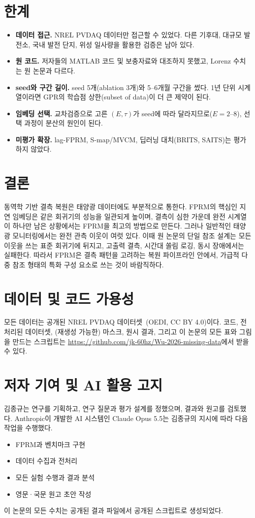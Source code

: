 \documentclass[11pt,a4paper]{article}
\begin{document}
\section{한계}\label{sec:limitations}
\begin{itemize}
  \item \textbf{데이터 접근.} NREL PVDAQ 데이터만 접근할 수 있었다. 다른 기후대, 대규모 발전소, 국내 발전 단지, 위성 일사량을 활용한 검증은 남아 있다.
  \item \textbf{원 코드.} 저자들의 MATLAB 코드 및 보충자료와 대조하지 못했고, Lorenz 수치는 원 논문과 다르다.
  \item \textbf{seed와 구간 길이.} seed 5개(ablation 3개)와 5--6개월 구간을 썼다. 1년 단위 시계열이라면 GPR의 학습점 상한(subset of data)이 더 큰 제약이 된다.
  \item \textbf{임베딩 선택.} 교차검증으로 고른 $(E,\tau)$가 seed에 따라 달라지므로($E=2$--8), 선택 과정이 분산의 원인이 된다.
  \item \textbf{미평가 확장.} lag-FPRM, S-map/MVCM, 딥러닝 대치(BRITS, SAITS)는 평가하지 않았다.
\end{itemize}

\section{결론}
동역학 기반 결측 복원은 태양광 데이터에도 부분적으로 통한다.
FPRM의 핵심인 지연 임베딩은 같은 회귀기의 성능을 일관되게 높이며, 결측이 심한 가운데 완전 시계열이 하나만 남은 상황에서는 FPRM을 최고의 방법으로 만든다.
그러나 일반적인 태양광 모니터링에서는 완전 관측 이웃이 여럿 있다.
이때 원 논문의 단일 참조 설계는 모든 이웃을 쓰는 표준 회귀기에 뒤지고, 고출력 결측, 시간대 쏠림 로깅, 동시 장애에서는 실패한다.
따라서 FPRM은 결측 패턴을 고려하는 복원 파이프라인 안에서, 가급적 다중 참조 형태의 특화 구성 요소로 쓰는 것이 바람직하다.

\section*{데이터 및 코드 가용성}
모든 데이터는 공개된 NREL PVDAQ 데이터셋~\cite{pvdaq}(OEDI, CC BY 4.0)이다.
코드, 전처리된 데이터셋, (재생성 가능한) 마스크, 원시 결과, 그리고 이 논문의 모든 표와 그림을 만드는 스크립트는 \url{https://github.com/jk-60hz/Wu-2026-missing-data}에서 받을 수 있다.

\section*{저자 기여 및 AI 활용 고지}
김종규는 연구를 기획하고, 연구 질문과 평가 설계를 정했으며, 결과와 원고를 검토했다.
Anthropic이 개발한 AI 시스템인 Claude Opus 5.5는 김종규의 지시에 따라 다음 작업을 수행했다.
\begin{itemize}
  \item FPRM과 벤치마크 구현
  \item 데이터 수집과 전처리
  \item 모든 실험 수행과 결과 분석
  \item 영문·국문 원고 초안 작성
\end{itemize}
이 논문의 모든 수치는 공개된 결과 파일에서 공개된 스크립트로 생성되었다.
\end{document}
